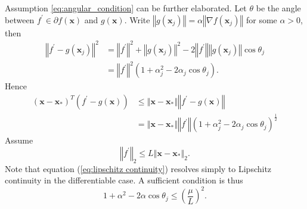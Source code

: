 \documentclass{article}
\renewcommand{\vec}[1]{\boldsymbol{#1}}
\newcommand{\norm}[1]{\left\Vert #1 \right\Vert}
\begin{document}
Assumption \ref{eq:angular_condition} can be further elaborated.
Let $\theta$ be the angle between $f^\prime \in\partial f(\vec{x})$ and $g(\vec{x})$. Write $\norm{g(\vec{x}_j)} = \alpha \norm{\nabla f(\vec{x}_j)}$ for some $\alpha>0$,
then
\begin{align}
	\norm{f^\prime-g(\vec{x}_j)}^2 &= \norm{f^\prime}^2 + \norm{g(\vec{x}_j)}^2 -2\norm{f^\prime}\norm{g(\vec{x}_j)}\cos\theta_j\\
	&=  \norm{f^\prime}^2(1+\alpha_j^2-2\alpha_j \cos\theta_j).
\end{align}
Hence
\begin{align}
	(\vec{x}-\vec{x}_*)^T (f^\prime -g(\vec{x})) &\leq \norm{\vec{x}-\vec{x}_*} \norm{f^\prime -g(\vec{x})}\\
	&= \norm{\vec{x}-\vec{x}_*} \norm{f^\prime}(1+\alpha_j^2-2\alpha_j \cos\theta_j)^{\frac{1}{2}}
\end{align}
Assume
\begin{equation}
\norm{f^\prime}_2\leq L \norm{\vec{x}-\vec{x}_*}_2.
\label{eq:lipschitz continuity}
\end{equation}
Note that equation (\ref{eq:lipschitz continuity}) resolves simply to Lipschitz continuity in the differentiable case.
A sufficient condition is thus
\begin{equation}
	1+\alpha^2-2\alpha \cos\theta_j\leq (\frac{\mu}{L})^2.
\end{equation}
\end{document}
